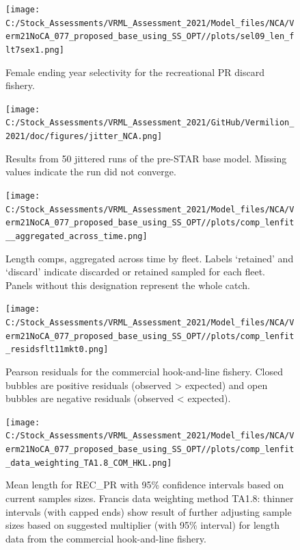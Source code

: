 \documentclass[
  english,
  a4paper,
]{article}
\begin{document}
\begin{figure}
\centering
\texttt{[image: C:/Stock\_Assessments/VRML\_Assessment\_2021/Model\_files/NCA/Verm21NoCA\_077\_proposed\_base\_using\_SS\_OPT//plots/sel09\_len\_flt7sex1.png]}
\caption{Female ending year selectivity for the recreational PR discard fishery.\label{fig:endyr-selex-REC-PR-DIS}}
\end{figure}

\FloatBarrier

\begin{figure}
\centering
\texttt{[image: C:/Stock\_Assessments/VRML\_Assessment\_2021/GitHub/Vermilion\_2021/doc/figures/jitter\_NCA.png]}
\caption{Results from 50 jittered runs of the pre-STAR base model. Missing values indicate the run did not converge.\label{fig:jitter}}
\end{figure}

\FloatBarrier

\FloatBarrier

\begin{figure}
\centering
\texttt{[image: C:/Stock\_Assessments/VRML\_Assessment\_2021/Model\_files/NCA/Verm21NoCA\_077\_proposed\_base\_using\_SS\_OPT//plots/comp\_lenfit\_\_aggregated\_across\_time.png]}
\caption{Length comps, aggregated across time by fleet.
Labels `retained' and `discard' indicate discarded or retained sampled for each fleet. Panels without this designation represent the whole catch.\label{fig:lenfits-all}}
\end{figure}

\FloatBarrier

\begin{figure}
\centering
\texttt{[image: C:/Stock\_Assessments/VRML\_Assessment\_2021/Model\_files/NCA/Verm21NoCA\_077\_proposed\_base\_using\_SS\_OPT//plots/comp\_lenfit\_residsflt11mkt0.png]}
\caption{Pearson residuals for the commercial hook-and-line fishery. Closed bubbles are positive residuals (observed \textgreater{} expected) and open bubbles are negative residuals (observed \textless{} expected).\label{fig:len-pearson-COM-HKL}}
\end{figure}

\begin{figure}
\centering
\texttt{[image: C:/Stock\_Assessments/VRML\_Assessment\_2021/Model\_files/NCA/Verm21NoCA\_077\_proposed\_base\_using\_SS\_OPT//plots/comp\_lenfit\_data\_weighting\_TA1.8\_COM\_HKL.png]}
\caption{Mean length for REC\_PR with 95\% confidence intervals based on current samples sizes. Francis data weighting method TA1.8: thinner intervals (with capped ends) show result of further adjusting sample sizes based on suggested multiplier (with 95\% interval) for length data from the commercial hook-and-line fishery.\label{fig:mean-len-fit-COM-HKL}}
\end{figure}
\end{document}
